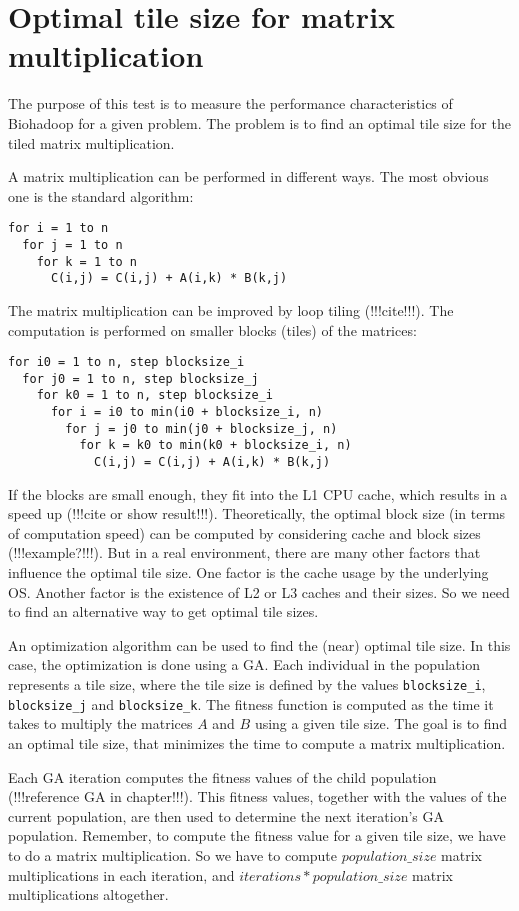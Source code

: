 \documentclass{article}
\begin{document}
\section{Optimal tile size for matrix multiplication}
The purpose of this test is to measure the performance characteristics of Biohadoop for a given problem. The problem is to find an optimal tile size for the tiled matrix multiplication.

A matrix multiplication can be performed in different ways. The most obvious one is the standard algorithm:
\begin{lstlisting}
for i = 1 to n
  for j = 1 to n
    for k = 1 to n
      C(i,j) = C(i,j) + A(i,k) * B(k,j)
\end{lstlisting}

The matrix multiplication can be improved by loop tiling (!!!cite!!!). The computation is performed on smaller blocks (tiles) of the matrices:
\begin{lstlisting}
for i0 = 1 to n, step blocksize_i
  for j0 = 1 to n, step blocksize_j
    for k0 = 1 to n, step blocksize_i
      for i = i0 to min(i0 + blocksize_i, n)
        for j = j0 to min(j0 + blocksize_j, n)
          for k = k0 to min(k0 + blocksize_i, n)
            C(i,j) = C(i,j) + A(i,k) * B(k,j)
\end{lstlisting}

If the blocks are small enough, they fit into the L1 CPU cache, which results in a speed up (!!!cite or show result!!!). Theoretically, the optimal block size (in terms of computation speed) can be computed by considering cache and block sizes (!!!example?!!!). But in a real environment, there are many other factors that influence the optimal tile size. One factor is the cache usage by the underlying OS. Another factor is the existence of L2 or L3 caches and their sizes. So we need to find an alternative way to get optimal tile sizes.

An optimization algorithm can be used to find the (near) optimal tile size. In this case, the optimization is done using a GA. Each individual in the population represents a tile size, where the tile size is defined by the values \texttt{blocksize\_i}, \texttt{blocksize\_j} and \texttt{blocksize\_k}. The fitness function is computed as the time it takes to multiply the matrices $A$ and $B$ using a given tile size. The goal is to find an optimal tile size, that minimizes the time to compute a matrix multiplication.

Each GA iteration computes the fitness values of the child population (!!!reference GA in chapter!!!). This fitness values, together with the values of the current population, are then used to determine the next iteration's GA population. Remember, to compute the fitness value for a given tile size, we have to do a matrix multiplication. So we have to compute $population\_size$ matrix multiplications in each iteration, and $iterations * population\_size$ matrix multiplications altogether.
\end{document}
